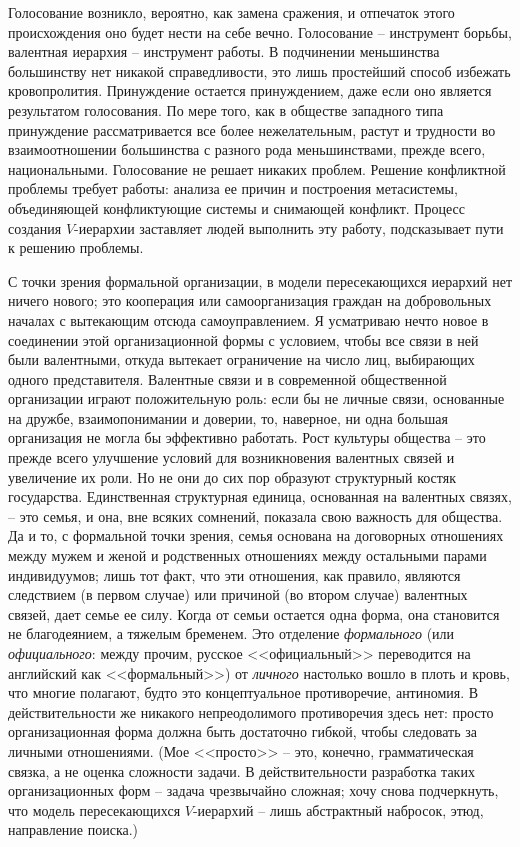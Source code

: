 \documentclass{book}
\begin{document}
Голосование возникло, вероятно, как замена сражения, и от­печаток этого происхождения оно будет нести на себе вечно. Голосование -- инструмент борьбы, валентная иерархия -- инст­румент работы. В подчинении меньшинства большинству нет ни­какой справедливости, это лишь простейший способ избежать кровопролития. Принуждение остается принуждением, даже ес­ли оно является результатом голосования. По мере того, как в обществе западного типа принуждение рассматривается все более нежелательным, растут и трудности во взаимоотношении большинства с разного рода меньшинствами, прежде всего, национальными. Голосование не решает никаких проблем. Решение конфликтной проблемы требует работы: анализа ее причин и по­строения метасистемы, объединяющей конфликтующие системы и снимающей конфликт. Процесс создания $V$-иерархии заставля­ет людей выполнить эту работу, подсказывает пути к решению проблемы.

С точки зрения формальной организации, в модели пересека­ющихся иерархий нет ничего нового; это кооперация или самоор­ганизация граждан на добровольных началах с вытекающим от­сюда самоуправлением. Я усматриваю нечто новое в соединении этой организационной формы с условием, чтобы все связи в ней были валентными, откуда вытекает ограничение на число лиц, выбирающих одного представителя. Валентные связи и в совре­менной общественной организации играют положительную роль:
если бы не личные связи, основанные на дружбе, взаимопонима­нии и доверии, то, наверное, ни одна большая организация не мог­ла бы эффективно работать. Рост культуры общества -- это преж­де всего улучшение условий для возникновения валентных свя­зей и увеличение их роли. Но не они до сих пор образуют струк­турный костяк государства. Единственная структурная единица, основанная на валентных связях, -- это семья, и она, вне всяких сомнений, показала свою важность для общества. Да и то, с фор­мальной точки зрения, семья основана на договорных отношениях между мужем и женой и родственных отношениях между осталь­ными парами индивидуумов; лишь тот факт, что эти отношения, как правило, являются следствием (в первом случае) или причи­ной (во втором случае) валентных связей, дает семье ее силу. Когда от семьи остается одна форма, она становится не благодея­нием, а тяжелым бременем. Это отделение \textit{формального}  (или \textit{официального}:  между прочим, русское <<официальный>> перево­дится на английский как 
<<формальный>>) от \textit{личного}  настолько вошло в плоть и кровь, что многие полагают, будто это концеп­туальное противоречие, антиномия. В действительности же ника­кого непреодолимого противоречия здесь нет: просто организа­ционная форма должна быть достаточно гибкой, чтобы следо­вать за личными отношениями. (Мое <<просто>> -- это, конечно, грамматическая связка, а не оценка сложности задачи. В дейст­вительности разработка таких организационных форм -- задача чрезвычайно сложная; хочу снова подчеркнуть, что модель пересекающихся $V$-иерархий -- лишь абстрактный набросок, этюд, направление поиска.)
\end{document}
